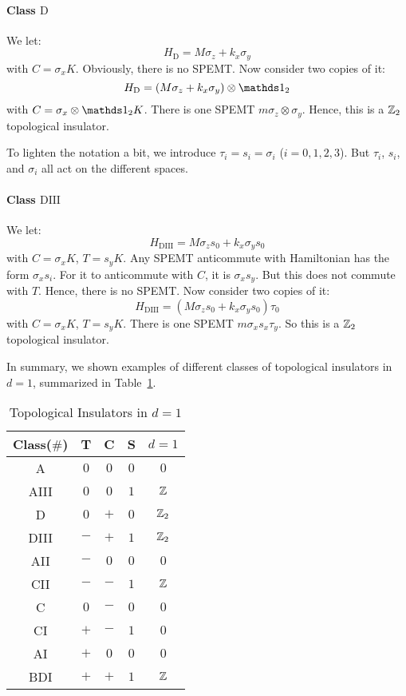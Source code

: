 \documentclass{article}
\begin{document}
\paragraph{Class $\mathrm{D}$} We let:
\begin{equation}
    H_{\mathrm{D}} = M\sigma_z + k_x \sigma_y
\end{equation}
with $C=\sigma_x K$. Obviously, there is no SPEMT. Now consider two copies of
it:
\begin{equation}
    H_{\mathrm{D}} = (M\sigma_z + k_x \sigma_y)\otimes\id_2
\end{equation}
with $C=\sigma_x\otimes\id_2 K$. There is one SPEMT $m \sigma_z\otimes\sigma_y$.
Hence, this is a $\mathbb{Z}_2$ topological insulator.

To lighten the notation a bit, we introduce $\tau_i=s_i=\sigma_i$ ($i=0,1,2,3$).
But $\tau_i$, $s_i$, and $\sigma_i$ all act on the different spaces.
\paragraph{Class $\mathrm{DIII}$} We let:
\begin{equation}
    H_{\mathrm{DIII}} = M \sigma_z s_0 + k_x \sigma_y s_0
\end{equation}
with $C=\sigma_x K$, $T=s_y K$. Any SPEMT anticommute with Hamiltonian has the
form $\sigma_x s_i$. For it to anticommute with $C$, it is $\sigma_x s_y$. But
this does not commute with $T$. Hence, there is no SPEMT. Now consider two
copies of it:
\begin{equation}
    H_{\mathrm{DIII}} = (M \sigma_z s_0 + k_x \sigma_y s_0)\tau_0
\end{equation}
with $C=\sigma_x K$, $T=s_y K$.  There is one SPEMT $m \sigma_xs_x\tau_y$. So
this is a $\mathbb{Z}_2$ topological insulator.

In summary, we shown examples of different classes of topological insulators in
$d=1$, summarized in Table~\ref{tab:ti-d=1}.
\begin{table}[htpb]
    \centering
    \caption{Topological Insulators in $d=1$}
    \label{tab:ti-d=1}
    \begin{tabular}{c | c c c | c }
        Class($\#$) & T & C & S & $d=1$ \\
        \hline 
        A & $0$ & $0$ & $0$ & $0$ \\
        AIII & $0$ & $0$ & $1$ & $\mathbb{Z}$ \\
        \hline
        D & $0$ & $+$ & $0$ & $\mathbb{Z}_2$ \\
        DIII & $-$ & $+$ & $1$ & $\mathbb{Z}_2$ \\
        AII & $-$ & $0$ & $0$ & $0$ \\
        CII & $-$ & $-$ & $1$ & $\mathbb{Z}$ \\
        C & $0$ & $-$ & $0$ & $0$ \\
        CI & $+$ & $-$ & $1$ & $0$ \\
        AI & $+$ & $0$ & $0$ & $0$ \\
        BDI & $+$ & $+$ & $1$ & $\mathbb{Z}$ \\
        \hline
    \end{tabular}
\end{table}
\end{document}
